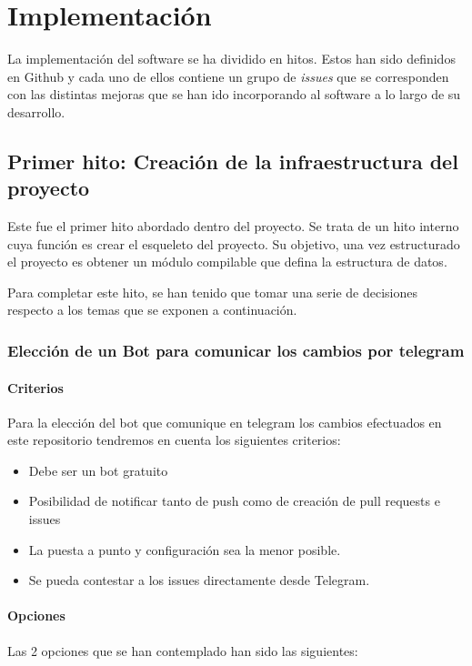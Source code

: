 \chapter{Implementación}

La implementación del software se ha dividido en hitos. Estos han sido definidos en Github
y cada uno de ellos contiene un grupo de \textit{issues} que se corresponden con las distintas
mejoras que se han ido incorporando al software a lo largo de su desarrollo.\\

\section{Primer hito: Creación de la infraestructura del proyecto}

Este fue el primer hito abordado dentro del proyecto. Se trata de un hito interno cuya función es crear el esqueleto del proyecto.
Su objetivo, una vez estructurado el proyecto es obtener un módulo compilable que defina la estructura de datos.

Para completar este hito, se han tenido que tomar una serie de decisiones respecto a los temas que se exponen a continuación.
\newpage

\subsection{Elección de un Bot para comunicar los cambios por telegram \cite{telegram}}

\subsubsection{Criterios}
Para la elección del bot que comunique en telegram los cambios
efectuados en este repositorio tendremos en cuenta los siguientes
criterios:

\begin{itemize}
    \item Debe ser un bot gratuito
    \item Posibilidad de notificar tanto
de push como de creación de pull requests e issues
    \item La puesta a punto
y configuración sea la menor posible.
    \item Se pueda contestar a los issues
directamente desde Telegram.
\end{itemize}

\subsubsection{Opciones}
Las 2 opciones que se han contemplado han sido las siguientes:\\

